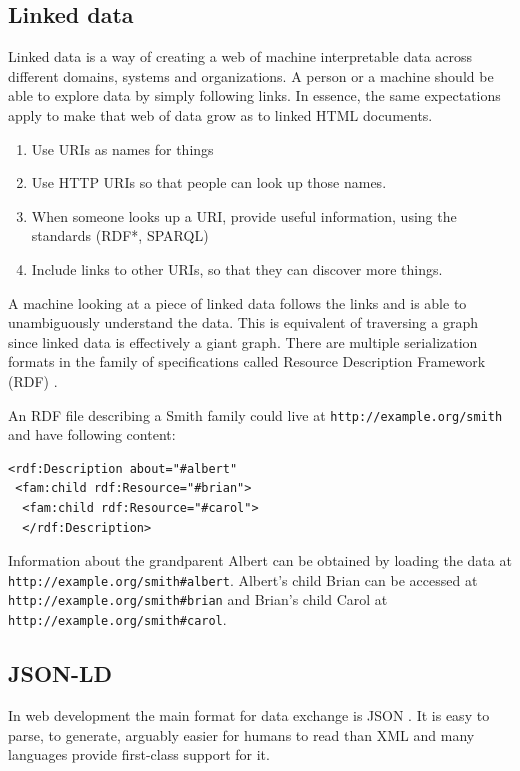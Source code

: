 \subsection{Linked data}\label{linkeddata}
Linked data is a way of creating a web of machine interpretable data across different domains, systems and organizations. A person or a machine should be able to explore data by simply following links. In essence, the same expectations apply to make that web of data grow as to linked HTML documents. \citep{linkedatafourrules}

\begin{enumerate}
  \item Use URIs as names for things
  \item Use HTTP URIs so that people can look up those names.
  \item When someone looks up a URI, provide useful information, using the standards (RDF*, SPARQL)
  \item Include links to other URIs, so that they can discover more things.
\end{enumerate}

A machine looking at a piece of linked data follows the links and is able to unambiguously understand the data. This is equivalent of traversing a graph since linked data is effectively a giant graph. There are multiple serialization formats in the family of specifications called Resource Description Framework (RDF) \citep{rdfspecification}.

An RDF file describing a Smith family could live at \lstinline{http://example.org/smith} and have following content:

\lstset{language=XML}
\begin{lstlisting}[caption= Simple example of a person as RDF, label=rdfexample]
<rdf:Description about="#albert"
 <fam:child rdf:Resource="#brian">
  <fam:child rdf:Resource="#carol">
  </rdf:Description>
\end{lstlisting}

Information about the grandparent Albert can be obtained by loading the data at \\ \lstinline{http://example.org/smith#albert}. Albert's child Brian can be accessed at \\  \lstinline{http://example.org/smith#brian} and Brian's child Carol at \lstinline{http://example.org/smith#carol}.

\subsection{JSON-LD}\label{jsonld}
In web development the main format for data exchange is JSON \citep{jsonformat}. It is easy to parse, to generate, arguably easier for humans to read than XML and many languages provide first-class support for it.

